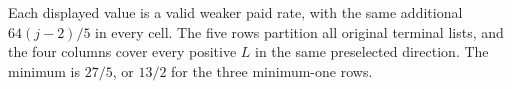 Each displayed value is a valid weaker paid rate, with the same additional \(64(j-2)/5\) in every cell. The five rows partition all original terminal lists, and the four columns cover every positive \(L\) in the same preselected direction. The minimum is \(27/5\), or \(13/2\) for the three minimum-one rows.
